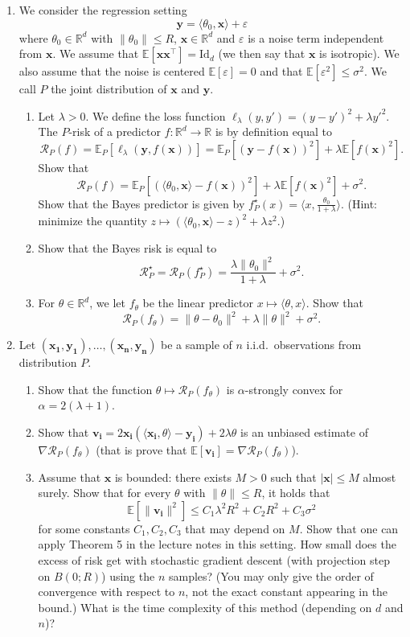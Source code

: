 \documentclass[12pt]{article}
\renewcommand{\b}[1]{\mathbf{#1 }}
\newcommand{\dotp}[1]{\langle #1 \rangle}
\newcommand{\Id}{\mathrm{Id}}
\newcommand{\E}{\mathbb{E}}
\newcommand{\R}{\mathbb{R}}
\newcommand{\RR}{\mathcal{R}}
\newcommand{\eps}{\varepsilon}
\begin{document}
\begin{enumerate}
\item We consider the regression setting
\[ \b{y} = \dotp{\theta_0,\b{x}} + \eps \]
where $\theta_0 \in \R^d$ with $\|\theta_0\|\leq R$, $\b{x}\in\R^d$ and $\eps$ is a noise term independent from $\b{x}$. We assume that $\E[\b{x}\b{x}^\top ] =  \Id_d$ (we then say that $\b{x}$ is isotropic). We also assume that the noise is centered $\E[\eps]= 0$ and that $\E[\eps^2]\leq \sigma^2$. We call $P$ the joint distribution of $\b{x}$ and $\b{y}$. 
\begin{enumerate}

\item Let $\lambda >0$. We define the loss function $\ell_\lambda(y,y')= (y-y')^2 + \lambda y'^2$. The $P$-risk of a predictor $f:\R^d\to \R$ is by definition equal to 
\[ \RR_P(f) = \E_P[\ell_\lambda(\b{y},f(\b{x}))] = \E_P[(\b{y}-f(\b{x}))^2] + \lambda \E[f(\b{x})^2].\]
Show that 
\[ \RR_P(f) = \E_P[(\dotp{\theta_0,\b{x}}-f(\b{x}))^2] + \lambda \E[f(\b{x})^2] + \sigma^2.\]
Show that the Bayes predictor is given by $f^\star_P(x)=\dotp{x, \frac{\theta_0}{1+\lambda}}$. (Hint: minimize the quantity $z\mapsto (\dotp{\theta_0,\b{x}}-z)^2 + \lambda z^2$.)
\item Show that the Bayes risk is equal to 
\[ \RR_P^\star = \RR_P(f^\star_P) = \frac{\lambda \|\theta_0\|^2}{1+\lambda} + \sigma^2.\]
\item For $\theta\in \R^d$, we let $f_\theta$ be the linear predictor $x\mapsto \dotp{\theta,x}$. Show that
\[ \RR_P(f_\theta) = \|\theta-\theta_0\|^2 + \lambda\|\theta\|^2 +  \sigma^2.\]
\end{enumerate}
\item Let $(\b{x_1},\b{y_1}),\dots,(\b{x_n},\b{y_n})$ be a sample of $n$ i.i.d.~observations from distribution $P$.
\begin{enumerate}
\item Show that the function $\theta\mapsto \RR_P(f_\theta)$ is $\alpha$-strongly convex for $\alpha=2(\lambda +1)$.
\item %
Show that $\b{v_i}= 2\b{x_i}(\dotp{\b{x_i},\theta} -\b{y_i}) + 2\lambda \theta$ is an unbiased estimate of $\nabla \RR_P(f_\theta)$ (that is prove that $\E[\b{v_i}]=\nabla \RR_P(f_\theta)$).
\item  Assume that $\b{x}$ is bounded: there exists $M>0$ such that $|\b{x}|\leq M$ almost surely. Show that for every $\theta$ with $\|\theta\|\leq R$, it holds that \[\E[\|\b{v_i}\|^2] \leq C_1\lambda^2 R^2+ C_2 R^2+ C_3 \sigma^2\] for some constants $C_1,C_2,C_3$ that may depend on $M$. Show that one can apply Theorem 5 in the lecture notes in this setting. How small does the excess of risk get with stochastic gradient descent (with projection step on $B(0;R)$) using the $n$ samples? (You may only give the order of convergence with respect to $n$, not the exact constant appearing in the bound.) What is the time complexity of this method (depending on $d$ and $n$)?
\end{enumerate}


\end{enumerate}
\end{document}
